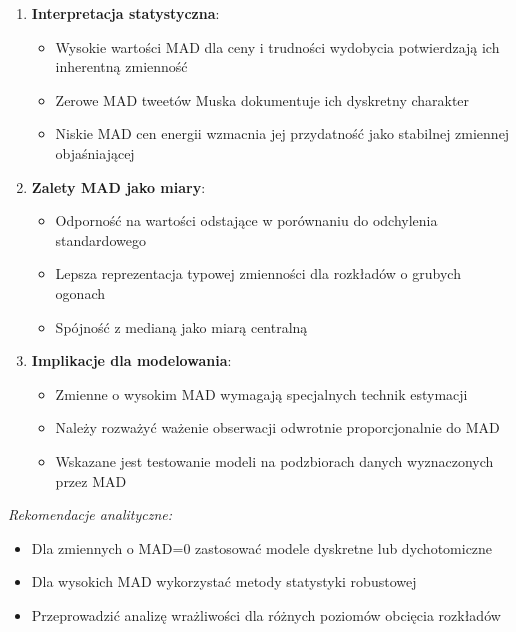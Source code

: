 \documentclass[
  11pt,
]{article}
\providecommand{\tightlist}{%
  \setlength{\itemsep}{0pt}\setlength{\parskip}{0pt}}
\begin{document}
\begin{enumerate}
\def\labelenumi{\arabic{enumi}.}
\tightlist
\item
  \textbf{Interpretacja statystyczna}: \vspace{0.2cm}

  \begin{itemize}
  \tightlist
  \item
    Wysokie wartości MAD dla ceny i trudności wydobycia potwierdzają ich
    inherentną zmienność
  \item
    Zerowe MAD tweetów Muska dokumentuje ich dyskretny charakter
  \item
    Niskie MAD cen energii wzmacnia jej przydatność jako stabilnej
    zmiennej objaśniającej
  \end{itemize}
\item
  \textbf{Zalety MAD jako miary}: \vspace{0.2cm}

  \begin{itemize}
  \tightlist
  \item
    Odporność na wartości odstające w porównaniu do odchylenia
    standardowego
  \item
    Lepsza reprezentacja typowej zmienności dla rozkładów o grubych
    ogonach
  \item
    Spójność z medianą jako miarą centralną
  \end{itemize}
\item
  \textbf{Implikacje dla modelowania}: \vspace{0.2cm}

  \begin{itemize}
  \tightlist
  \item
    Zmienne o wysokim MAD wymagają specjalnych technik estymacji
  \item
    Należy rozważyć ważenie obserwacji odwrotnie proporcjonalnie do MAD
  \item
    Wskazane jest testowanie modeli na podzbiorach danych wyznaczonych
    przez MAD
  \end{itemize}
\end{enumerate}

\vspace{0.3cm}

\textit{Rekomendacje analityczne:}

\begin{itemize}
\item Dla zmiennych o MAD=0 zastosować modele dyskretne lub dychotomiczne
\item Dla wysokich MAD wykorzystać metody statystyki robustowej
\item Przeprowadzić analizę wrażliwości dla różnych poziomów obcięcia rozkładów
\end{itemize}
\end{document}
